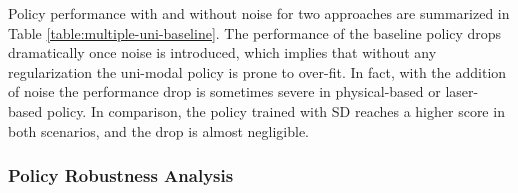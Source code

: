 \documentclass[../thesis.tex]{subfiles}
\begin{document}
Policy performance with and without noise for two approaches are summarized in Table \ref{table:multiple-uni-baseline}. 
The performance of the baseline policy drops dramatically once noise is introduced, which implies that without any regularization the uni-modal policy is prone to over-fit. In fact, with the addition of noise the performance drop is sometimes severe in physical-based or laser-based policy. 
In comparison, the policy trained with SD reaches a higher score in both scenarios, and the drop is almost negligible.
 





\subsubsection{Policy Robustness Analysis}
\end{document}
